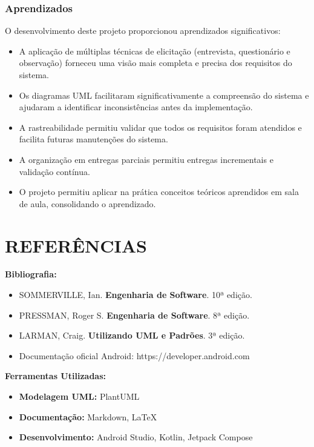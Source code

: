\documentclass[12pt]{article}
\begin{document}
\subsubsection{Aprendizados}

O desenvolvimento deste projeto proporcionou aprendizados significativos:

\begin{itemize}
    \item A aplicação de múltiplas técnicas de elicitação (entrevista, questionário e observação) forneceu uma visão mais completa e precisa dos requisitos do sistema.
    \item Os diagramas UML facilitaram significativamente a compreensão do sistema e ajudaram a identificar inconsistências antes da implementação.
    \item A rastreabilidade permitiu validar que todos os requisitos foram atendidos e facilita futuras manutenções do sistema.
    \item A organização em entregas parciais permitiu entregas incrementais e validação contínua.
    \item O projeto permitiu aplicar na prática conceitos teóricos aprendidos em sala de aula, consolidando o aprendizado.
\end{itemize}

\section{REFERÊNCIAS}

\textbf{Bibliografia:}
\begin{itemize}
    \item SOMMERVILLE, Ian. \textbf{Engenharia de Software}. 10ª edição.
    \item PRESSMAN, Roger S. \textbf{Engenharia de Software}. 8ª edição.
    \item LARMAN, Craig. \textbf{Utilizando UML e Padrões}. 3ª edição.
    \item Documentação oficial Android: https://developer.android.com
\end{itemize}

\textbf{Ferramentas Utilizadas:}
\begin{itemize}
    \item \textbf{Modelagem UML:} PlantUML
    \item \textbf{Documentação:} Markdown, LaTeX
    \item \textbf{Desenvolvimento:} Android Studio, Kotlin, Jetpack Compose
\end{itemize}
\end{document}
